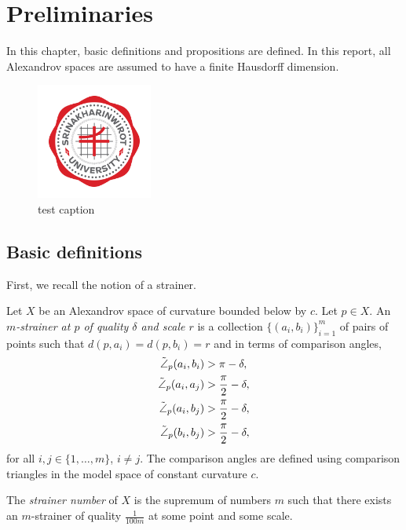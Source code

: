 \documentclass[ma491]{swumath}
\begin{document}
\chapter{Preliminaries}
In this chapter, basic definitions and propositions are defined. In this report, all Alexandrov spaces are assumed to have a finite Hausdorff dimension.

\begin{figure}
\begin{center}
\includegraphics[width=1.5in]{Srinakharinwirot_Logo_EN_Color.png}
\caption{test caption}
\end{center}
\end{figure}
 
\section{Basic definitions} 
First, we recall the notion of a strainer.
\begin{definition}
Let $X$ be an Alexandrov space of curvature bounded below by $c$. Let $p \in X$.
An \emph{$m$-strainer at $p$ of quality $\delta$ and scale $r$} is a collection $\{(a_i, b_i)\}_{i=1}^m$ 
of pairs of points such that $d(p,a_i) = d(p, b_i) = r$ and in terms of comparison angles,
\begin{align}
\tilde{\angle}_p(a_i, b_i) & > \pi - \delta, \\
\tilde{\angle}_p(a_i, a_j) & > \frac{\pi}{2} - \delta, \notag \\
\tilde{\angle}_p(a_i, b_j) & > \frac{\pi}{2} - \delta, \notag \\
\tilde{\angle}_p(b_i, b_j) & > \frac{\pi}{2} - \delta, \notag 
\end{align}
for all $i,j \in \{1, \ldots, m\}$, $i \neq j$.
The comparison angles are defined using comparison triangles in the model space of constant curvature $c$.
\end{definition}

\begin{definition}
The \emph{strainer number} of $X$ is the supremum of numbers $m$ such that there exists an $m$-strainer of quality $\frac{1}{100m}$ at some point and some scale.
\end{definition}
 
\end{document}
